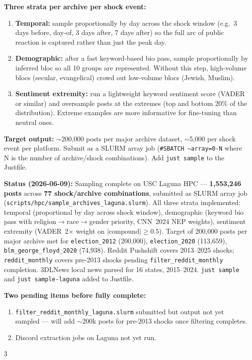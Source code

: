 \documentclass[11pt]{article}
\begin{document}
\begin{taskbox}
{  \textbf{Three strata per archive per shock event:}
  \begin{enumerate}[leftmargin=1.6em, itemsep=1pt]
    \item \textbf{Temporal:} sample proportionally by day across the shock
          window (e.g.\ 3 days before, day-of, 3 days after, 7 days after)
          so the full arc of public reaction is captured rather than just
          the peak day.
    \item \textbf{Demographic:} after a fast keyword-based bio pass, sample
          proportionally by inferred bloc so all 10 groups are represented.
          Without this step, high-volume blocs (secular, evangelical) crowd out
          low-volume blocs (Jewish, Muslim).
    \item \textbf{Sentiment extremity:} run a lightweight keyword sentiment
          score (VADER or similar) and oversample posts at the extremes
          (top and bottom 20\% of the distribution). Extreme examples are
          more informative for fine-tuning than neutral ones.
  \end{enumerate}

  \textbf{Target output:} $\sim$200,000 posts per major archive dataset,
  $\sim$5,000 per shock event per platform. Submit as a SLURM array job
  (\texttt{\#SBATCH --array=0-N} where N is the number of archive/shock
  combinations). Add \texttt{just sample} to the Justfile.

  \textbf{Status (2026-06-09):} Sampling complete on USC Laguna HPC ---
  \textbf{1,553,246 posts} across \textbf{77 shock/archive combinations},
  submitted as SLURM array job
  (\texttt{scripts/hpc/sample\_archives\_laguna.slurm}).
  All three strata implemented: temporal (proportional by day across shock
  window), demographic (keyword bio pass with religion$\to$race$\to$gender
  priority, CNN~2024 NEP weights), sentiment extremity (VADER~2$\times$
  weight on $|\text{compound}| \geq 0.5$).
  Target of 200,000 posts per major archive met for
  \texttt{election\_2012} (200,000), \texttt{election\_2020} (113,659),
  \texttt{blm\_george\_floyd\_2020} (74,938).
  Reddit Pushshift covers 2013--2025 shocks;
  \texttt{reddit\_monthly} covers pre-2013 shocks pending
  \texttt{filter\_reddit\_monthly} completion.
  3DLNews local news parsed for 16 states, 2015--2024.
  \texttt{just sample} and \texttt{just sample-laguna} added to Justfile.

  \textbf{Two pending items before fully complete:}
  \begin{enumerate}[leftmargin=1.6em, itemsep=1pt]
    \item \texttt{filter\_reddit\_monthly\_laguna.slurm} submitted but output
          not yet sampled --- will add $\sim$200k posts for pre-2013 shocks
          once filtering completes.
    \item Discord extraction jobs on Laguna not yet run.
  \end{enumerate}}{3}


\end{taskbox}
\end{document}
